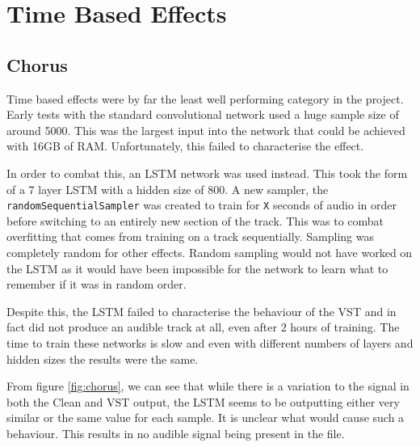 \documentclass{l4proj}
\begin{document}
\section{Time Based Effects}\label{time-based-effects}

\subsection{Chorus}\label{chorus}

Time based effects were by far the least well performing category in the
project. Early tests with the standard convolutional network used a huge
sample size of around 5000. This was the largest input into the network
that could be achieved with 16GB of RAM. Unfortunately, this failed to
characterise the effect.

In order to combat this, an LSTM network was used instead. This took the
form of a 7 layer LSTM with a hidden size of 800. A new sampler, the
\texttt{randomSequentialSampler} was created to train for \texttt{X}
seconds of audio in order before switching to an entirely new section of
the track. This was to combat overfitting that comes from training on a
track sequentially. Sampling was completely random for other effects.
Random sampling would not have worked on the LSTM as it would have been
impossible for the network to learn what to remember if it was in random
order.

Despite this, the LSTM failed to characterise the behaviour of the VST
and in fact did not produce an audible track at all, even after 2 hours
of training. The time to train these networks is slow and even with
different numbers of layers and hidden sizes the results were the same.

From figure \ref{fig:chorus}, we can see that while there is a variation
to the signal in both the Clean and VST output, the LSTM seems to be
outputting either very similar or the same value for each sample. It is
unclear what would cause such a behaviour. This results in no audible
signal being present in the file.
\end{document}

